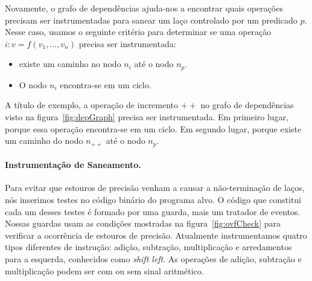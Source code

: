 \documentclass{llncs}
\begin{document}
Novamente, o grafo de dependências ajuda-nos a encontrar quais operações
precisam ser instrumentadas para sanear um laço controlado por um
predicado $p$.
Nesse caso, usamos o seguinte critério para determinar se uma operação
$i : v = f(v_1, \ldots, v_n)$ precisa ser instrumentada:
%
\begin{itemize}
\item existe um caminho no nodo $n_i$ até o nodo $n_p$.
\item O nodo $n_i$ encontra-se em um ciclo.
\end{itemize}
%
A título de exemplo, a operação de incremento $++$ no grafo de dependências
visto na figura~\ref{fig:depGraph} precisa ser instrumentada.
Em primeiro lugar, porque essa operação encontra-se em um ciclo.
Em segundo lugar, porque existe um caminho do nodo $n_{++}$ até o nodo
$n_p$.

\paragraph{Instrumentação de Saneamento. }
Para evitar que estouros de precisão venham a causar a não-terminação
de laços, nós inserimos testes no código binário do programa alvo.
O código que constitui cada um desses testes é formado por uma guarda, mais
um tratador de eventos.
Nossas guardas usam as condições mostradas na figura~\ref{fig:ovfCheck} para
verificar a ocorrência de estouros de precisão.
Atualmente instrumentamos quatro tipos diferentes de instrução:
adição, subtração, multiplicação e arredamentos para a esquerda, conhecidos como {\em shift left}.
As operações de adição, subtração e multiplicação podem ser com ou sem sinal
aritmético.
\end{document}
